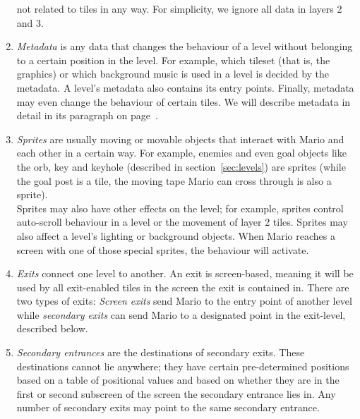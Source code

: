 \begin{enumerate}
  not related to tiles in any way. For simplicity, we ignore all data
  in layers 2 and 3.
\item \emph{Metadata} is any data that changes the behaviour of a
  level without belonging to a certain position in the level. For
  example, which tileset (that is, the graphics) or which background
  music is used in a level is decided by the metadata. A level's
  metadata also contains its entry points. Finally, metadata may even
  change the behaviour of certain tiles. We will describe metadata in
  detail in its paragraph on page~\pageref{par:metadata}.
\item \emph{Sprites} are usually moving or movable objects that
  interact with Mario and each other in a certain way. For example,
  enemies and even goal objects like the orb, key and keyhole
  (described in section~\ref{sec:levels}) are sprites (while the goal
  post is a tile, the moving tape Mario can cross through is also a
  sprite). \\
  Sprites may also have other effects on the level; for example,
  sprites control auto-scroll behaviour in a level or the movement of
  layer 2 tiles. Sprites may also affect a level's lighting or
  background objects. When Mario reaches a screen with one of those
  special sprites, the behaviour will activate.
\item \emph{Exits} connect one level to another. An exit is
  screen-based, meaning it will be used by all exit-enabled tiles in
  the screen the exit is contained in. There are two types of exits:
  \emph{Screen exits} send Mario to the entry point of another level
  while \emph{secondary exits} can send Mario to a designated point in
  the exit-level, described below.
\item \emph{Secondary entrances} are the destinations of secondary
  exits. These destinations cannot lie anywhere; they have certain
  pre-determined positions based on a table of positional values and
  based on whether they are in the first or second subscreen of the
  screen the secondary entrance lies in. Any number of secondary exits
  may point to the same secondary entrance.
\end{enumerate}

